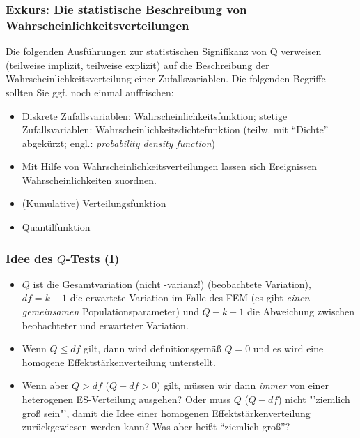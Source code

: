 \begin{frame}
  \frametitle{Exkurs: Die statistische Beschreibung von Wahrscheinlichkeitsverteilungen}
  Die folgenden Ausführungen zur statistischen Signifikanz von Q verweisen (teilweise implizit, teilweise explizit) auf
  die Beschreibung der Wahrscheinlichkeitsverteilung einer Zufallsvariablen. Die folgenden Begriffe sollten Sie ggf. noch einmal auffrischen:
  \begin{itemize}
  \item Diskrete Zufallsvariablen: Wahrscheinlichkeitsfunktion; stetige Zufallsvariablen:
    Wahrscheinlichkeitsdichtefunktion (teilw. mit "`Dichte"' abgekürzt; engl.: \emph{probability density function})
  \item Mit Hilfe von Wahrscheinlichkeitsverteilungen lassen sich Ereignissen Wahrscheinlichkeiten zuordnen.
  \item (Kumulative) Verteilungsfunktion
  \item Quantilfunktion
  \end{itemize}
\end{frame}



\begin{frame}
  \frametitle{Idee des $Q$-Tests (I)}
  \begin{itemize}
  \item $Q$ ist die Gesamtvariation (nicht -varianz!) (beobachtete Variation), $df = k-1$ die erwartete Variation im
    Falle des FEM (es gibt \emph{einen gemeinsamen} Populationsparameter) und $Q-k-1$ die Abweichung zwischen
    beobachteter und erwarteter Variation.
  \item Wenn $Q \leq df$ gilt, dann wird definitionsgemäß $Q=0$ und es wird eine homogene Effektstärkenverteilung
    unterstellt.
  \item Wenn aber $Q > df$ ($Q-df > 0$) gilt, müssen wir dann \emph{immer} von einer heterogenen ES-Verteilung ausgehen? Oder
    muss $Q$ ($Q-df$) nicht "'ziemlich groß sein"', damit die Idee einer homogenen Effektstärkenverteilung zurückgewiesen
    werden kann? Was aber heißt "`ziemlich groß"'?
  \end{itemize}
\end{frame}


